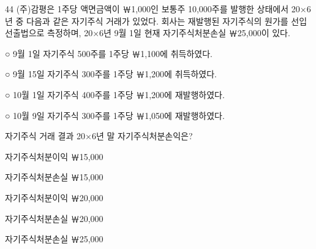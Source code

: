 \begin{question}{44}
(주)감평은 1주당 액면금액이 ￦1,000인 보통주 10,000주를 발행한 상태에서 20×6년 중 다음과 같은 자기주식 거래가 있었다. 회사는 재발행된 자기주식의 원가를 선입선출법으로 측정하며, 20×6년 9월 1일 현재 자기주식처분손실 ￦25,000이 있다.
\begin{framedtext}
○ 9월 1일 자기주식 500주를 1주당 ￦1,100에 취득하였다. \par
○ 9월 15일 자기주식 300주를 1주당 ￦1,200에 취득하였다. \par
○ 10월 1일 자기주식 400주를 1주당 ￦1,200에 재발행하였다. \par
○ 10월 9일 자기주식 300주를 1주당 ￦1,050에 재발행하였다. \par
\end{framedtext}
자기주식 거래 결과 20×6년 말 자기주식처분손익은?
\begin{choices}
  \item 자기주식처분이익 ￦15,000
  \item 자기주식처분손실 ￦15,000
  \item 자기주식처분이익 ￦20,000
  \item 자기주식처분손실 ￦20,000
  \item 자기주식처분손실 ￦25,000
\end{choices}
\end{question}
